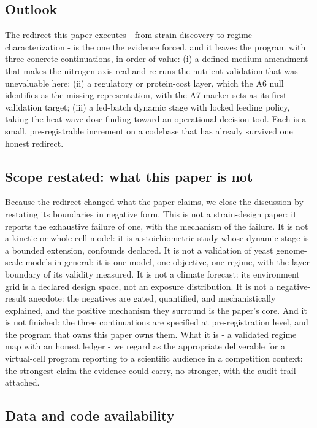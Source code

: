 \documentclass[12pt]{article}
\begin{document}
\subsection{Outlook}

The redirect this paper executes - from strain discovery to
regime characterization - is the one the evidence forced, and it
leaves the program with three concrete continuations, in order of
value: (i) a defined-medium amendment that makes the nitrogen axis
real and re-runs the nutrient validation that was unevaluable here;
(ii) a regulatory or protein-cost layer, which the A6 null identifies
as the missing representation, with the A7 marker sets as its first
validation target; (iii) a fed-batch dynamic stage with locked feeding
policy, taking the heat-wave dose finding toward an operational
decision tool. Each is a small, pre-registrable increment on a
codebase that has already survived one honest redirect.

\subsection{Scope restated: what this paper is not}

Because the redirect changed what the paper claims, we close the
discussion by restating its boundaries in negative form. This is not
a strain-design paper: it reports the exhaustive failure of one,
with the mechanism of the failure. It is not a kinetic or whole-cell
model: it is a stoichiometric study whose dynamic stage is a bounded
extension, confounds declared. It is not a validation of yeast
genome-scale models in general: it is one model, one objective, one
regime, with the layer-boundary of its validity measured. It is not a
climate forecast: its environment grid is a declared design space,
not an exposure distribution. It is not a negative-result anecdote:
the negatives are gated, quantified, and mechanistically explained,
and the positive mechanism they surround is the paper's core. And it
is not finished: the three continuations are specified at
pre-registration level, and the program that owns this paper owns
them. What it is - a validated regime map with an honest ledger - we
regard as the appropriate deliverable for a virtual-cell program
reporting to a scientific audience in a competition context: the
strongest claim the evidence could carry, no stronger, with the
audit trail attached.

\subsection{Data and code availability}
\end{document}
